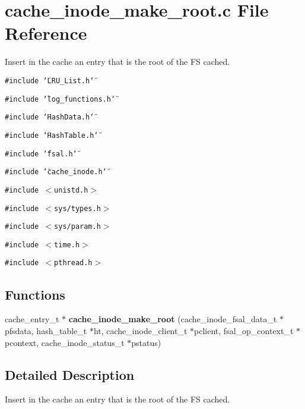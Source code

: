 \section{cache\_\-inode\_\-make\_\-root.c File Reference}
\label{cache__inode__make__root_8c}
Insert in the cache an entry that is the root of the FS cached. 

{\tt \#include \char`\"{}LRU\_\-List.h\char`\"{}}\par
{\tt \#include \char`\"{}log\_\-functions.h\char`\"{}}\par
{\tt \#include \char`\"{}Hash\-Data.h\char`\"{}}\par
{\tt \#include \char`\"{}Hash\-Table.h\char`\"{}}\par
{\tt \#include \char`\"{}fsal.h\char`\"{}}\par
{\tt \#include \char`\"{}cache\_\-inode.h\char`\"{}}\par
{\tt \#include $<$unistd.h$>$}\par
{\tt \#include $<$sys/types.h$>$}\par
{\tt \#include $<$sys/param.h$>$}\par
{\tt \#include $<$time.h$>$}\par
{\tt \#include $<$pthread.h$>$}\par
\subsection*{Functions}
\begin{CompactItemize}
\item 
cache\_\-entry\_\-t $\ast$ {\bf cache\_\-inode\_\-make\_\-root} (cache\_\-inode\_\-fsal\_\-data\_\-t $\ast$pfsdata, hash\_\-table\_\-t $\ast$ht, cache\_\-inode\_\-client\_\-t $\ast$pclient, fsal\_\-op\_\-context\_\-t $\ast$pcontext, cache\_\-inode\_\-status\_\-t $\ast$pstatus)
\end{CompactItemize}


\subsection{Detailed Description}
Insert in the cache an entry that is the root of the FS cached. 

